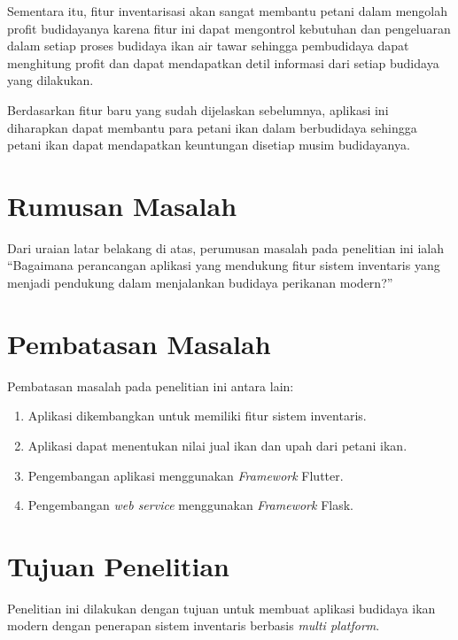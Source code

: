 Sementara itu, fitur inventarisasi akan sangat membantu petani dalam mengolah profit budidayanya karena fitur ini dapat mengontrol kebutuhan dan pengeluaran dalam setiap proses budidaya ikan air tawar sehingga pembudidaya dapat menghitung profit dan dapat mendapatkan detil informasi dari setiap budidaya yang dilakukan.

Berdasarkan fitur baru yang sudah dijelaskan sebelumnya, aplikasi ini diharapkan dapat membantu para petani ikan dalam berbudidaya sehingga petani ikan dapat mendapatkan keuntungan disetiap musim budidayanya.


\section{Rumusan Masalah}
Dari uraian latar belakang di atas, perumusan masalah pada penelitian ini ialah “Bagaimana perancangan aplikasi yang mendukung fitur sistem inventaris yang menjadi pendukung dalam menjalankan budidaya perikanan modern?”

\section{Pembatasan Masalah}
Pembatasan masalah pada penelitian ini antara lain:
\begin{enumerate}
	\item Aplikasi dikembangkan untuk memiliki fitur sistem inventaris.
	\item Aplikasi dapat menentukan nilai jual ikan dan upah dari petani ikan.
	\item Pengembangan aplikasi menggunakan \emph{Framework} Flutter.
	\item Pengembangan \emph{web service} menggunakan \emph{Framework} Flask.
\end{enumerate}

\section{Tujuan Penelitian}
	Penelitian ini dilakukan dengan tujuan untuk membuat aplikasi budidaya ikan modern dengan penerapan sistem inventaris berbasis \emph{multi platform}.

